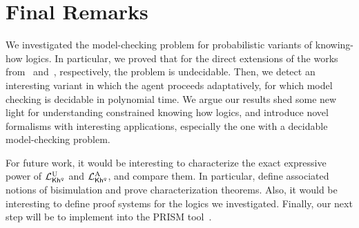 \section{Final Remarks}
\label{sec:final}

We investigated the model-checking problem for probabilistic variants of knowing-how logics.
In particular, we proved that for the direct extensions of the works from~\cite{Wang15lori} and~\cite{AFSVQ21}, respectively, the problem is undecidable. Then, we detect an interesting variant in which the agent proceeds adaptatively, for which model checking is decidable in polynomial time. We argue our results shed some new light for understanding constrained knowing how logics, and introduce novel formalisms with interesting applications, especially the one with a decidable model-checking problem.

For future work, it would be interesting to characterize the exact expressive power of ${\mathcal{L}^{\mathrm{U}}_{{\mathsf{Kh}}^q}}$ and ${\mathcal{L}^{\mathrm{A}}_{{\mathsf{Kh}}^q}}$, and compare them. In particular, define associated notions of bisimulation and prove characterization theorems. Also, it would be interesting to define proof systems for the logics we investigated. Finally, our next step will be to implement  into the PRISM tool~\cite{KwiatkowskaNP11}.
